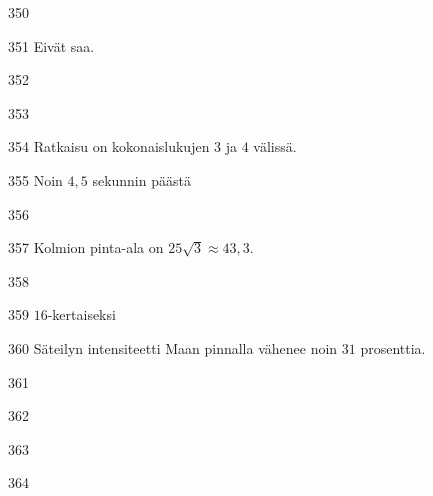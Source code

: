 \begin{Vastaus}{350}
\end{Vastaus}
\begin{Vastaus}{351}
Eivät saa.
\end{Vastaus}
\begin{Vastaus}{352}
	
\end{Vastaus}
\begin{Vastaus}{353}
	
\end{Vastaus}
\begin{Vastaus}{354}
Ratkaisu on kokonaislukujen $3$ ja $4$ välissä.
	
\end{Vastaus}
\begin{Vastaus}{355}
Noin $4,5$ sekunnin päästä
	
\end{Vastaus}
\begin{Vastaus}{356}
	
\end{Vastaus}
\begin{Vastaus}{357}
Kolmion pinta-ala on $25\sqrt{3}\approx43,3$.
\end{Vastaus}
\begin{Vastaus}{358}
\end{Vastaus}
\begin{Vastaus}{359}
$16$-kertaiseksi
\end{Vastaus}
\begin{Vastaus}{360}
Säteilyn intensiteetti Maan pinnalla vähenee noin $31$ prosenttia.
\end{Vastaus}
\begin{Vastaus}{361}
\end{Vastaus}
\begin{Vastaus}{362}
\end{Vastaus}
\begin{Vastaus}{363}
\end{Vastaus}
\begin{Vastaus}{364}
\end{Vastaus}
